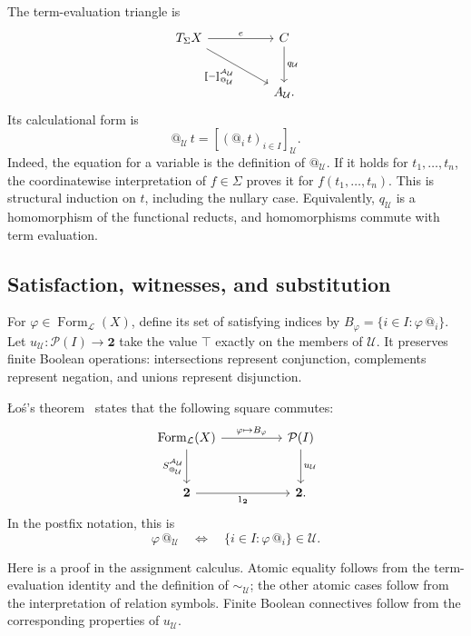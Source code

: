 \documentclass[11pt]{article}
\makeatletter
\newcommand{\llbracket}{\mathopen{[\mkern-3mu[}}
\newcommand{\rrbracket}{\mathclose{]\mkern-3mu]}}
\newcommand{\atsign}{\mathord{@}}
\makeatother
\begin{document}
The term-evaluation triangle is
\[
\begin{tikzcd}[row sep=large,column sep=huge]
T_\Sigma X \arrow[r,"e"]
  \arrow[dr,"\llbracket-\rrbracket^{\mathcal A_{\mathcal U}}_{\atsign_{\mathcal U}}"'] &
C \arrow[d,"q_{\mathcal U}"] \\
& A_{\mathcal U}.
\end{tikzcd}
\]
Its calculational form is
\[
\boxed{\atsign_{\mathcal U}\,t
=[(\atsign_i\,t)_{i\in I}]_{\mathcal U}.}
\]
Indeed, the equation for a variable is the definition of
\(\atsign_{\mathcal U}\). If it holds for \(t_1,\ldots,t_n\), the
coordinatewise interpretation of \(f\in\Sigma\) proves it for
\(f(t_1,\ldots,t_n)\). This is structural induction on \(t\), including
the nullary case. Equivalently, \(q_{\mathcal U}\) is a homomorphism of
the functional reducts, and homomorphisms commute with term evaluation.

\subsection{Satisfaction, witnesses, and substitution}

For \(\varphi\in\operatorname{Form}_{\mathcal L}(X)\), define its set of
satisfying indices by
\(B_\varphi=\{i\in I:\varphi\,\atsign_i\}\).
Let \(u_{\mathcal U}:\mathcal P(I)\to\mathbf2\) take the value
\(\top\) exactly on the members of \(\mathcal U\). It preserves finite
Boolean operations: intersections represent conjunction, complements
represent negation, and unions represent disjunction.

\L{}o\'s's theorem~\cite[Corollary~10]{LurieUltraproducts} states that the
following square commutes:
\[
\begin{tikzcd}[row sep=large,column sep=huge]
\operatorname{Form}_{\mathcal L}(X)
  \arrow[r,"\varphi\mapsto B_\varphi"]
  \arrow[d,"S^{\mathcal A_{\mathcal U}}_{\atsign_{\mathcal U}}"'] &
\mathcal P(I) \arrow[d,"u_{\mathcal U}"] \\
\mathbf2 \arrow[r,"1_{\mathbf2}"'] & \mathbf2.
\end{tikzcd}
\]
In the postfix notation, this is
\[
\boxed{\varphi\,\atsign_{\mathcal U}
\quad\Longleftrightarrow\quad
\{i\in I:\varphi\,\atsign_i\}\in\mathcal U.}
\]

Here is a proof in the assignment calculus. Atomic equality follows from
the term-evaluation identity and the definition of
\(\sim_{\mathcal U}\); the other atomic cases follow from the
interpretation of relation symbols. Finite Boolean connectives follow
from the corresponding properties of \(u_{\mathcal U}\).
\end{document}
